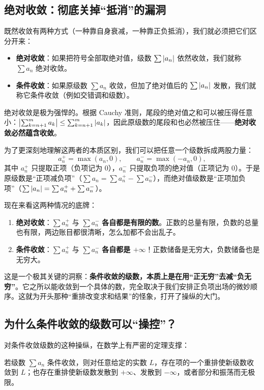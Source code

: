 \subsection{绝对收敛：彻底关掉“抵消”的漏洞}

既然收敛有两种方式（一种靠自身衰减，一种靠正负抵消），我们就必须把它们区分开来：
\begin{itemize}
    \item \textbf{绝对收敛}：如果把符号全部取绝对值，级数 $\sum \left|a_n\right|$ 依然收敛，我们就称 $\sum a_n$ 绝对收敛。
    \item \textbf{条件收敛}：如果原级数 $\sum a_n$ 收敛，但加了绝对值后的 $\sum \left|a_n\right|$ 发散，我们就称它条件收敛（例如交错调和级数）。
\end{itemize}

绝对收敛是极为强悍的。根据 Cauchy 准则，尾段的绝对值之和可以被压得任意小：$\bigl|\sum_{k=n+1}^{m}a_k\bigr|\le\sum_{k=n+1}^{m}\left|a_k\right|$，因此原级数的尾段和也必然被压住——\textbf{绝对收敛必然蕴含收敛}。

为了更深刻地理解这两者的本质区别，我们可以把任意一个级数拆成两股力量：
\[
a_n^+=\max(a_n,0),\qquad a_n^-=\max(-a_n,0),
\]
其中 $a_n^+$ 只提取正项（负项记为 0），$a_n^-$ 只提取负项的绝对值（正项记为 0）。于是原级数是“正项减负项”（$\sum a_n = \sum a_n^+ - \sum a_n^-$），而绝对值级数是“正项加负项”（$\sum \left|a_n\right| = \sum a_n^+ + \sum a_n^-$）。

现在来看这两种情况的底牌：
\begin{enumerate}
    \item \textbf{绝对收敛}：$\sum a_n^+$ 与 $\sum a_n^-$ \textbf{各自都是有限的数}。正数的总量有限，负数的总量也有限，两边账目都很清晰，怎么加都不会出乱子。
    \item \textbf{条件收敛}：$\sum a_n^+$ 与 $\sum a_n^-$ \textbf{各自都是 $+\infty$}！正数储备是无穷大，负数储备也是无穷大。
\end{enumerate}

这是一个极其关键的洞察：\textbf{条件收敛的级数，本质上是在用“正无穷”去减“负无穷”}。它之所以能收敛到一个具体的数，完全取决于我们安排正负项出场的微妙顺序。这就为开头那种“重排改变求和结果”的怪象，打开了操纵的大门。

\subsection{为什么条件收敛的级数可以“操控”？}

对条件收敛级数的这种操纵，在数学上有严密的定理支撑：

\begin{theorem}
若级数 \(\sum a_n\) 条件收敛，则对任意给定的实数 \(L\)，存在项的一个重排使新级数收敛到 \(L\)；也存在重排使新级数发散到 \(+\infty\)、发散到 \(-\infty\)，或者部分和振荡而无极限。
\end{theorem}

